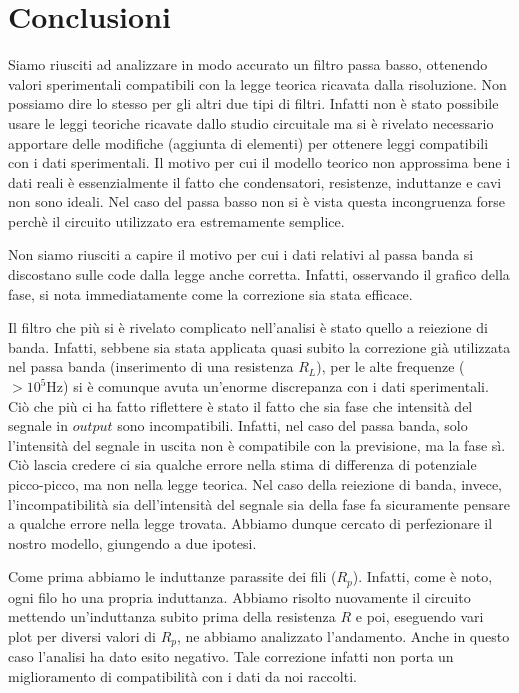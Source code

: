 \section{Conclusioni}

Siamo riusciti ad analizzare in modo accurato un filtro passa basso, ottenendo valori sperimentali compatibili con la legge teorica ricavata dalla risoluzione. Non possiamo dire lo stesso per gli altri due tipi di filtri. Infatti non è stato possibile usare le leggi teoriche ricavate dallo studio circuitale ma si è rivelato necessario apportare delle modifiche (aggiunta di elementi) per ottenere leggi compatibili con i dati sperimentali. Il motivo per cui il modello teorico non approssima bene i dati reali è essenzialmente il fatto che condensatori, resistenze, induttanze e cavi non sono ideali. Nel caso del passa basso non si è vista questa incongruenza forse perchè il circuito utilizzato era estremamente semplice. 

Non siamo riusciti a capire il motivo per cui i dati relativi al passa banda si discostano sulle code dalla legge anche corretta. Infatti, osservando il grafico della fase, si nota immediatamente come la correzione sia stata efficace.

Il filtro che più si è rivelato complicato nell'analisi è stato quello a reiezione di banda. Infatti, sebbene sia stata applicata quasi subito la correzione già utilizzata nel passa banda (inserimento di una resistenza $R_L$), per le alte frequenze ($>10^5 \si{\hertz}$) si è comunque avuta un'enorme discrepanza con i dati sperimentali. Ciò che più ci ha fatto riflettere è stato il fatto che sia fase che intensità del segnale in $output$ sono incompatibili. Infatti, nel caso del passa banda, solo l'intensità del segnale in uscita non è compatibile con la previsione, ma la fase sì. Ciò lascia credere ci sia qualche errore nella stima di differenza di potenziale picco-picco, ma non nella legge teorica. Nel caso della reiezione di banda, invece, l'incompatibilità sia dell'intensità del segnale sia della fase fa sicuramente pensare a qualche errore nella legge trovata. Abbiamo dunque cercato di perfezionare il nostro modello, giungendo a due ipotesi.

Come prima abbiamo le induttanze parassite dei fili ($R_p$). Infatti, come è noto, ogni filo ho una propria induttanza. Abbiamo risolto nuovamente il circuito mettendo un'induttanza subito prima della resistenza $R$ e poi, eseguendo vari plot per diversi valori di $R_p$, ne abbiamo analizzato l'andamento. Anche in questo caso l'analisi ha dato esito negativo. Tale correzione infatti non porta un miglioramento di compatibilità con i dati da noi raccolti.



